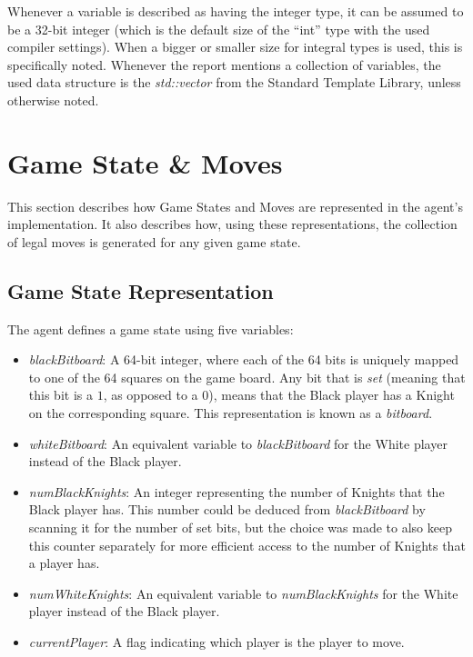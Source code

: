 \documentclass{article}
\begin{document}
Whenever a variable is described as having the integer type, it can be assumed to be a 32-bit integer (which is the default size of the ``int'' type with the used compiler settings). When a bigger or smaller size for integral types is used, this is specifically noted. Whenever the report mentions a collection of variables, the used data structure is the \emph{std::vector} from the Standard Template Library, unless otherwise noted.

\section{Game State \& Moves} \label{SectionGameStateMoves}
This section describes how Game States and Moves are represented in the agent's implementation. It also describes how, using these representations, the collection of legal moves is generated for any given game state.

\subsection{Game State Representation}
The agent defines a game state using five variables:
\begin{itemize}
\item \emph{blackBitboard}: A 64-bit integer, where each of the 64 bits is uniquely mapped to one of the 64 squares on the game board. Any bit that is \emph{set} (meaning that this bit is a $1$, as opposed to a $0$), means that the Black player has a Knight on the corresponding square. This representation is known as a \emph{bitboard}.
\item \emph{whiteBitboard}: An equivalent variable to \emph{blackBitboard} for the White player instead of the Black player.
\item \emph{numBlackKnights}: An integer representing the number of Knights that the Black player has. This number could be deduced from \emph{blackBitboard} by scanning it for the number of set bits, but the choice was made to also keep this counter separately for more efficient access to the number of Knights that a player has.
\item \emph{numWhiteKnights}: An equivalent variable to \emph{numBlackKnights} for the White player instead of the Black player.
\item \emph{currentPlayer}: A flag indicating which player is the player to move.
\end{itemize}
\end{document}
